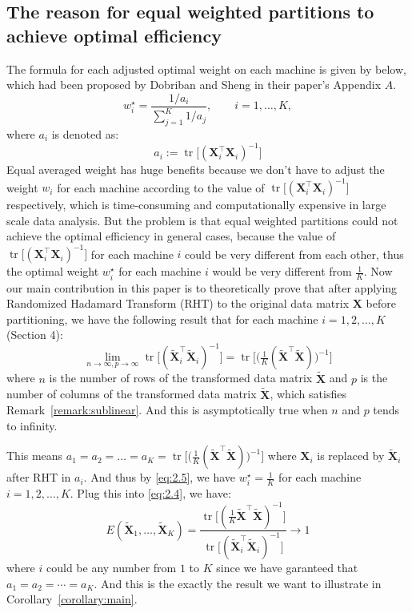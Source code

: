 \documentclass[11pt]{article}
\numberwithin{equation}{section}
\theoremstyle{plain}
\theoremstyle{definition}
\theoremstyle{remark}
\begin{document}
\subsection{The reason for equal weighted partitions to achieve optimal efficiency}
The formula for each adjusted optimal weight on each machine is given by below, which had been proposed by Dobriban and Sheng \cite{dobriban2022distributedlinearregressionaveraging} in their paper's Appendix $A$.
\[
    w_i^{\star}
      =\frac{\displaystyle 1/a_i}
         {\displaystyle\sum_{j=1}^{K}1/a_j},
      \qquad i=1,\dots,K,\tag{2.5} \label{eq:2.5}
  \]
where \(a_i\) is denoted as:
\[ 
a_i := \operatorname{tr}\!\bigl[(\mathbf{X}_i^{\top}\mathbf{X}_i)^{-1}\bigr]
\]
Equal averaged weight has huge benefits because we don't have to adjust the weight $w_i$ for each machine according to the value of $\operatorname{tr}\!\bigl[(\mathbf{X}_i^{\top}\mathbf{X}_i)^{-1}\bigr]$ respectively, which is time-consuming and computationally expensive in large scale data analysis.
But the problem is that equal weighted partitions could not achieve the optimal efficiency in general cases, because the value of $\operatorname{tr}\!\bigl[(\mathbf{X}_i^{\top}\mathbf{X}_i)^{-1}\bigr]$ for each machine $i$ could be very different from each other, thus the optimal weight $w_i^{\star}$ for each machine $i$ would be very different from $\frac{1}{K}$.
Now our main contribution in this paper is to theoretically prove that after applying Randomized Hadamard Transform (RHT) to the original data matrix $\mathbf{X}$ before partitioning, we have the following result that for each machine $i = 1,2,\ldots,K$ (Section 4):
\[
\lim_{n\to\infty,p\to\infty}\operatorname{tr}\bigl[(\tilde{\mathbf{X}}_i^{\top}\tilde{\mathbf{X}}_i)^{-1}\bigr]
  = \operatorname{tr}\bigl[\bigl(\tfrac{1}{K}(\tilde{\mathbf{X}}^{\top}\tilde{\mathbf{X}})\bigr)^{-1}\bigr] \tag{2.6} \label{eq:2.6}
\]
where $n$ is the number of rows of the transformed data matrix $\mathbf{\tilde{X}}$ and $p$ is the number of columns of the transformed data matrix $\mathbf{\tilde{X}}$, which satisfies Remark~\ref{remark:sublinear}. And this is asymptotically true when $n$ and $p$ tends to infinity.

This means $a_1 = a_2 = \ldots = a_K = \operatorname{tr}\bigl[\bigl(\tfrac{1}{K}(\tilde{\mathbf{X}}^{\top}\tilde{\mathbf{X}})\bigr)^{-1}\bigr]$ where $\mathbf{X}_i$ is replaced by $\mathbf{\tilde{X}}_i$ after RHT in $a_i$. And thus by \ref{eq:2.5}, we have $w_i^{\star} = \frac{1}{K}$ for each machine $i = 1,2,\ldots,K$. Plug this into \ref{eq:2.4}, we have:
\[
E(\mathbf{\tilde{X}}_1,\ldots,\mathbf{\tilde{X}}_K) = \frac{\operatorname{tr}\!\bigl[(\frac{1}{K}\mathbf{\tilde{X}}^{\top}\mathbf{\tilde{X}})^{-1}\bigr]} {{\operatorname{tr}\!\bigl[(\mathbf{\tilde{X}}_i^{\top}\mathbf{\tilde{X}}_i)^{-1}\bigr]}} \to 1 \tag{2.7} \label{eq:2.7}
\]
where $i$ could be any number from $1$ to $K$ since we have garanteed that \(a_1 = a_2 = \cdots = a_K\). And this is the exactly the result we want to illustrate in Corollary~\ref{corollary:main}.
\end{document}
